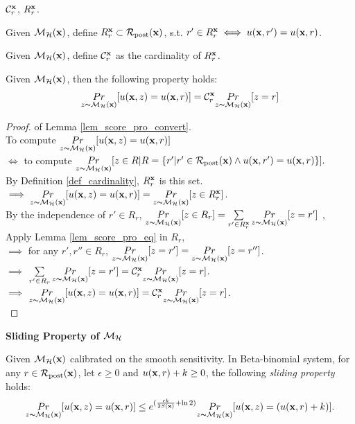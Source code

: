 \documentclass{article}
\begin{document}
\begin{definition}
\label{def_cardinality}
  $\cardinality{\dataobs}{r}$, $R^{\dataobs}_r$.

  Given $\hexpmech(\dataobs)$, define $R^{\dataobs}_r \subset \candidateset{\dataobs}$, s.t. $r' \in R^{\dataobs}_r \iff \ux{r'} = \ux{r}$.

  Given $\hexpmech(\dataobs)$, define $\cardinality{\dataobs}{r}$ as the cardinality of $R^{\dataobs}_r$. 
\end{definition}

\begin{lem}
\label{lem_score_pro_convert}
 Given $\hexpmech(\dataobs)$, then the following property holds:
\begin{equation*}
\hexpmechPr{\dataobs}{\ux{z} = \ux{r}} = \cardinality{\dataobs}{r}\hexpmechPr{\dataobs}{z = r}
 \end{equation*}
\end{lem}
\begin{proof} of Lemma \ref{lem_score_pro_convert}.\\
To compute $\hexpmechPr{\dataobs}{\ux{z} = \ux{r}}$\\
$\iff $ to compute $\hexpmechPr{\dataobs}{ z \in R | R = \{r' | r' \in \candidateset{\dataobs} \land \ux{r'} = \ux{r}\}}.$\\
By Definition \ref{def_cardinality}, $R^{\dataobs}_r$ is this set.\\
$\implies \hexpmechPr{\dataobs}{\ux{z} = \ux{r}} = \hexpmechPr{\dataobs}{z \in R^{\dataobs}_r} $.\\
By the independence of $r' \in R_r$, $ \hexpmechPr{\dataobs}{z \in R_r}  =\sum\limits_{r'\in R^{\dataobs}_r} \hexpmechPr{\dataobs}{z = r'}$ ,\\
Apply Lemma \ref{lem_score_pro_eq} in $R_r$, \\
$\implies$ for any $r', r''\in R_r$, $\hexpmechPr{\dataobs}{z = r'} = \hexpmechPr{\dataobs}{z = r''}$.\\
$\implies$ $\sum\limits_{r'\in R_r} \hexpmechPr{\dataobs}{z = r'} = \cardinality{\dataobs}{r}\hexpmechPr{\dataobs}{z = r}$.\\
$\implies$ $\hexpmechPr{\dataobs}{\ux{z} = \ux{r}} = \cardinality{\dataobs}{r}\hexpmechPr{\dataobs}{z = r}$.\\
\end{proof}


\noindent \textbf{Sliding Property of $\hexpmech$}


\begin{lem}
\label{lem_sliding}

Given $\hexpmech(\dataobs)$ calibrated on the smooth sensitivity. In Beta-binomial system, for any $r\in \candidateset{\dataobs}$, let $\epsilon\geq 0$ and $\ux{r} + k \geq 0$, the following \emph{sliding property} holds:
\begin{equation*}
\hexpmechPr{\dataobs}{\ux{z} = \ux{r}}
\leq
e^{(\frac{\epsilon k}{2 S(\dataobs)} + \ln 2)} \hexpmechPr{\dataobs}{\ux{z} = ( \ux{r} + k)}.
\end{equation*}
\end{lem}
\end{document}
